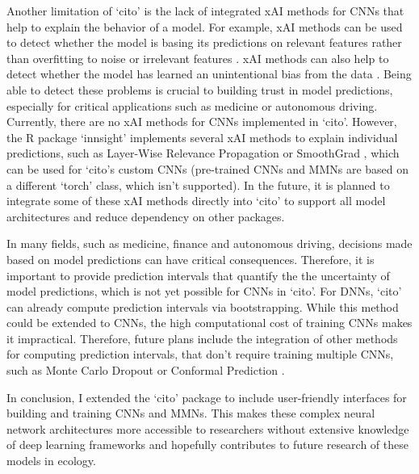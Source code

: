 \documentclass[12pt,twoside]{scrreport}
\newcommand{\pkg}[1]{`#1'}
\begin{document}
Another limitation of \pkg{cito} is the lack of integrated xAI methods for CNNs that help to explain the behavior of a model. For example, xAI methods can be used to detect whether the model is basing its predictions on relevant features rather than overfitting to noise or irrelevant features \citep[e.g., basing the classification of images of wolves or dogs on whether or not there is snow in the background ][]{ribeiroWhyShouldTrust2016}. xAI methods can also help to detect whether the model has learned an unintentional bias from the data \citep[e.g., gender bias in the classification of images of doctors or nurses ][]{selvarajuGradCAMVisualExplanations2020}. Being able to detect these problems is crucial to building trust in model predictions, especially for critical applications such as medicine or autonomous driving. Currently, there are no xAI methods for CNNs implemented in \pkg{cito}. However, the R package \pkg{innsight} \citep{koenenInterpretingDeepNeural2024} implements several xAI methods to explain individual predictions, such as Layer-Wise Relevance Propagation \citep{bachPixelWiseExplanationsNonLinear2015a} or SmoothGrad \citep{smilkovSmoothGradRemovingNoise2017}, which can be used for \pkg{cito}s custom CNNs (pre-trained CNNs and MMNs are based on a different \pkg{torch} class, which isn't supported). In the future, it is planned to integrate some of these xAI methods directly into \pkg{cito} to support all model architectures and reduce dependency on other packages.

In many fields, such as medicine, finance and autonomous driving, decisions made based on model predictions can have critical consequences. Therefore, it is important to provide prediction intervals that quantify the the uncertainty of model predictions, which is not yet possible for CNNs in \pkg{cito}. For DNNs, \pkg{cito} can already compute prediction intervals via bootstrapping. While this method could be extended to CNNs, the high computational cost of training CNNs makes it impractical. Therefore, future plans include the integration of other methods for computing prediction intervals, that don't require training multiple CNNs, such as Monte Carlo Dropout \citep{galDropoutBayesianApproximation2016} or Conformal Prediction \citep{shafer2008tutorial}.

In conclusion, I extended the \pkg{cito} package to include user-friendly interfaces for building and training CNNs and MMNs. This makes these complex neural network architectures more accessible to researchers without extensive knowledge of deep learning frameworks and hopefully contributes to future research of these models in ecology.
\end{document}
